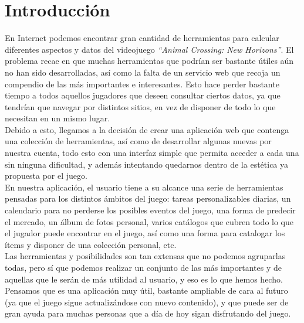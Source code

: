 \chapter{Introducción}\label{introduccion}

En Internet podemos encontrar gran cantidad de herramientas para calcular diferentes aspectos y datos del videojuego \textit{``Animal Crossing: New Horizons”}. El problema recae en que muchas herramientas que podrían ser bastante útiles aún no han sido desarrolladas, así como la falta de un servicio web que recoja un compendio de las más importantes e interesantes. Esto hace perder bastante tiempo a todos aquellos jugadores que deseen consultar ciertos datos, ya que tendrían que navegar por distintos sitios, en vez de disponer de todo lo que necesitan en un mismo lugar.\\

Debido a esto, llegamos a la decisión de crear una aplicación web que contenga una colección de herramientas, así como de desarrollar algunas nuevas por nuestra cuenta, todo esto con una interfaz simple que permita acceder a cada una sin ninguna dificultad, y además intentando quedarnos dentro de la estética ya propuesta por el juego.\\

En nuestra aplicación, el usuario tiene a su alcance una serie de herramientas pensadas para los distintos ámbitos del juego: tareas personalizables diarias, un calendario para no perderse los posibles eventos del juego, una forma de predecir el mercado, un álbum de fotos personal, varios catálogos que cubren todo lo que el jugador puede encontrar en el juego, así como una forma para catalogar los ítems y disponer de una colección personal, etc.\\

Las herramientas y posibilidades son tan extensas que no podemos agruparlas todas, pero sí que podemos realizar un conjunto de las más importantes y de aquellas que le serán de más utilidad al usuario, y eso es lo que hemos hecho. Pensamos que es una aplicación muy útil, bastante ampliable de cara al futuro (ya que el juego sigue actualizándose con nuevo contenido), y que puede ser de gran ayuda para muchas personas que a día de hoy sigan disfrutando del juego.\\